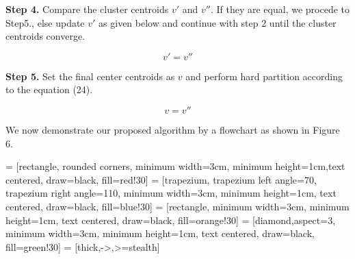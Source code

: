 \documentclass[journal, onecolumn]{IEEEtran}
\begin{document}
\textbf{Step 4.}
Compare the cluster centroids $v'$ and $v''$. If they are equal, we procede to Step5., else update $v'$ as given below and continue with step 2 until the cluster centroids converge.

\begin{equation}
v'=v''
\end{equation}

\textbf{Step 5.}
Set the final center centroids as $v$ and perform hard partition according to the equation (24).

\begin{equation}
v=v''
\end{equation}

We now demonstrate our proposed algorithm by a flowchart as shown in Figure 6.

\vspace{5mm}
 = [rectangle, rounded corners, minimum width=3cm, minimum height=1cm,text centered, draw=black, fill=red!30]
 = [trapezium, trapezium left angle=70, trapezium right angle=110, minimum width=3cm, minimum height=1cm, text centered, draw=black, fill=blue!30]
 = [rectangle, minimum width=3cm, minimum height=1cm, text centered, draw=black, fill=orange!30]
 = [diamond,aspect=3, minimum width=3cm, minimum height=1cm, text centered, draw=black, fill=green!30]
 = [thick,->,>=stealth]
\end{document}
